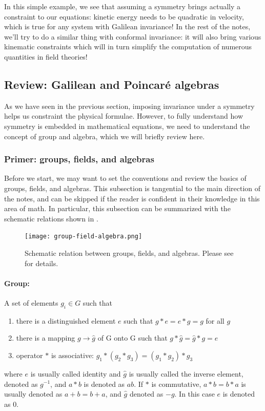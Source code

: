\documentclass[12pt]{article}
\numberwithin{equation}{section}
\begin{document}
In this simple example, we see that assuming a symmetry brings actually a constraint to our equations: kinetic energy needs to be quadratic in velocity, which is true for any system with Galilean invariance! In the rest of the notes, we'll try to do a similar thing with conformal invariance: it will also bring various kinematic constraints which will in turn simplify the computation of numerous quantities in field theories! 

\subsection{Review: Galilean and Poincar\'e algebras}
As we have seen in the previous section, imposing invariance under a symmetry helps us constraint the physical formulae. However, to fully understand how symmetry is embedded in mathematical equations, we need to understand the concept of group and algebra, which we will briefly review here.

\subsubsection{Primer: groups, fields, and algebras}
\label{sec: review of groups, fields, and algebras}
Before we start, we may want to set the conventions and review the basics of groups, fields, and algebras. This subsection is tangential to the main direction of the notes, and can be skipped if the reader is confident in their knowledge in this area of math. In particular, this subsection can be summarized with the schematic relations shown in \figref{\ref{fig: group-field-algebra}}.
\begin{figure}
	\centering 
	\texttt{[image: group-field-algebra.png]}
	\caption[Schematic relation between groups, fields, and algebras]{\label{fig: group-field-algebra} Schematic relation between groups, fields, and algebras. Please see \secref{\ref{sec: review of groups, fields, and algebras}} for details.}
\end{figure}

\paragraph{Group:} A set of elements $g_i \in G$ such that
\begin{enumerate}
	\item there is a distinguished element $e$ such that $g*e=e*g=g$ for all $g$
	\item there is a mapping $g\to \hat g$ of G onto G such that $g*\hat g=\hat g*g=e$
	\item operator $*$ is associative: $g_1*(g_2*g_3)=(g_1*g_2)*g_3$
\end{enumerate}
where $e$ is usually called identity and $\hat g$ is usually called the inverse element, denoted as $g^{-1}$, and $a*b$ is denoted as $a b$. If $*$ is commutative, $a*b=b*a$ is usually denoted as $a+b=b+a$, and $\hat g$ denoted as $-g$. In this case $e$ is denoted as $0$.
\end{document}
